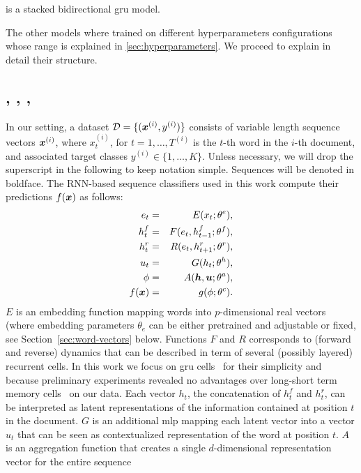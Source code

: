 \gru{} is a stacked bidirectional \ac{gru} model.

The other models where trained on different hyperparameters
configurations whose range is explained in
\cref{sec:hyperparameters}. We proceed to explain in detail their
structure.
\subsection{\maxp, \softmax, \maxi, \softmaxi}
\label{sec:model}
In our setting, a dataset $\mathcal{D}=\{(\bm{x}^{(i)},y^{(i)})\}$
consists of variable length sequence vectors $\bm{x}^{(i)}$, where
$x^{(i)}_t$, for $t=1,\dots,T^{(i)}$ is the $t$-th word in the $i$-th
document, and associated target classes
$y^{(i)}\in\{1,\dots,K\}$. Unless necessary, we will drop the
superscript in the following to keep notation simple.  Sequences will
be denoted in boldface. The RNN-based sequence classifiers used in
this work compute their predictions $f(\bm{x})$ as follows:
\begin{align}
  e_t &=& E(x_t;\theta^e),\label{eq:embed}\\
  h^f_t &=& F(e_t,h^f_{t-1};\theta^f),\label{eq:maxModelRL}\\  
  h^r_t &=& R(e_t,h^r_{t+1};\theta^r),\label{eq:maxModelRR}\\
  u_t &=& G(h_t;\theta^h),\label{eq:maxModelF}\\
  \phi & =& A(\bm{h},\bm{u};\theta^a),\label{eq:aggregation}\\
  f(\bm{x}) &=& g(\phi;\theta^c).\label{eq:maxModelC}
\end{align}
$E$ is an embedding function mapping words into $p$-dimensional real
vectors (where embedding parameters $\theta_e$ can be either
pretrained and adjustable or fixed, see Section~\ref{sec:word-vectors}
below.  Functions $F$ and $R$ corresponds to (forward and reverse)
dynamics that can be described in term of several (possibly layered)
recurrent cells. In this work we focus on \ac{gru}
cells~\cite{cho2014properties} for their simplicity and because
preliminary experiments revealed no advantages over long-short term
memory cells~\cite{hochreiter1997long} on our data. Each vector $h_t$,
the concatenation of $h^f_t$ and $h^r_t$, can be interpreted as latent
representations of the information contained at position $t$ in the
document. $G$ is an additional \ac{mlp} mapping each latent vector into a
vector $u_t$ that can be seen as contextualized representation of the
word at position $t$. $A$ is an aggregation function that creates a
single $d$-dimensional representation vector for the entire sequence
